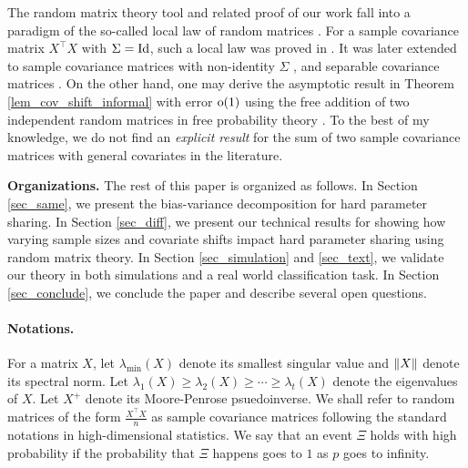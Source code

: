 The random matrix theory tool and related proof of our work fall into a paradigm of the so-called local law of random matrices \cite{erdos2017dynamical}.
For a sample covariance matrix $X^\top X$ with $\Sigma=\operatorname{Id}$, such a local law was proved in \cite{isotropic}.
It was later extended to sample covariance matrices with non-identity $\Sigma$ \cite{Anisotropic}, and separable covariance matrices \cite{yang2019spiked}. On the other hand, one may derive the asymptotic result in Theorem \ref{lem_cov_shift_informal} with error $\operatorname{o}(1)$ using the free addition of two independent random matrices in free probability theory \cite{nica2006lectures}. To the best of my knowledge, we do not find an {\it explicit result} for the sum of two sample covariance matrices with general covariates in the literature.

\smallskip
\noindent\textbf{Organizations.}
The rest of this paper is organized as follows.
In Section \ref{sec_same}, we present the bias-variance decomposition for hard parameter sharing.
In Section \ref{sec_diff}, we present our technical results for showing how varying sample sizes and covariate shifts impact hard parameter sharing using random matrix theory.
In Section \ref{sec_simulation} and \ref{sec_text}, we validate our theory in both simulations and a real world classification task.
In Section \ref{sec_conclude}, we conclude the paper and describe several open questions.

\paragraph{Notations.}
For a matrix $X$, let $\lambda_{\min}(X)$ denote its smallest singular value and $\|X\|$ denote its spectral norm.
Let $\lambda_1(X) \ge \lambda_2(X) \ge \cdots \ge \lambda_t(X)$ denote the eigenvalues of $X$.
Let $X^+$ denote its Moore-Penrose psuedoinverse.
We shall refer to random matrices of the form $\frac {X^\top X} n$ as sample covariance matrices following the standard notations in high-dimensional statistics.
We say that an event $\Xi$ holds with high probability if the probability that $\Xi$ happens goes to $1$ as $p$ goes to infinity.
